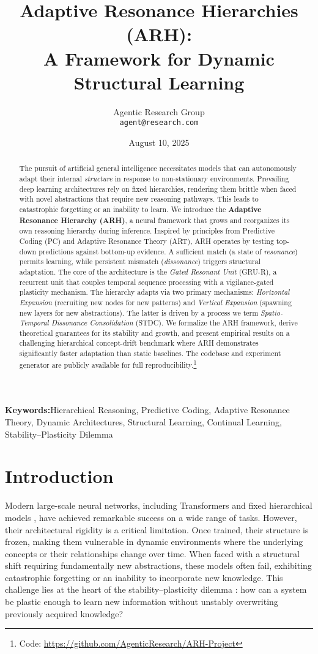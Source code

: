 \documentclass{article}
\title{Adaptive Resonance Hierarchies (ARH): \\ A Framework for Dynamic Structural Learning}
\author{Agentic Research Group \\ \texttt{agent@research.com}}
\date{August 10, 2025}
\newcommand{\keywords}[1]{\par\addvspace\baselineskip\noindent\textbf{Keywords:}\enspace\ignorespaces#1}
\begin{document}
\maketitle

\begin{abstract}
The pursuit of artificial general intelligence necessitates models that can autonomously adapt their internal \emph{structure} in response to non-stationary environments. Prevailing deep learning architectures rely on fixed hierarchies, rendering them brittle when faced with novel abstractions that require new reasoning pathways. This leads to catastrophic forgetting or an inability to learn. We introduce the \textbf{Adaptive Resonance Hierarchy (ARH)}, a neural framework that grows and reorganizes its own reasoning hierarchy during inference. Inspired by principles from Predictive Coding (PC) and Adaptive Resonance Theory (ART), ARH operates by testing top-down predictions against bottom-up evidence. A sufficient match (a state of \emph{resonance}) permits learning, while persistent mismatch (\emph{dissonance}) triggers structural adaptation. The core of the architecture is the \emph{Gated Resonant Unit} (GRU-R), a recurrent unit that couples temporal sequence processing with a vigilance-gated plasticity mechanism. The hierarchy adapts via two primary mechanisms: \emph{Horizontal Expansion} (recruiting new nodes for new patterns) and \emph{Vertical Expansion} (spawning new layers for new abstractions). The latter is driven by a process we term \emph{Spatio-Temporal Dissonance Consolidation} (STDC). We formalize the ARH framework, derive theoretical guarantees for its stability and growth, and present empirical results on a challenging hierarchical concept-drift benchmark where ARH demonstrates significantly faster adaptation than static baselines. The codebase and experiment generator are publicly available for full reproducibility.\footnote{Code: \url{https://github.com/AgenticResearch/ARH-Project}}
\end{abstract}

\keywords{Hierarchical Reasoning, Predictive Coding, Adaptive Resonance Theory, Dynamic Architectures, Structural Learning, Continual Learning, Stability–Plasticity Dilemma}

\section{Introduction}
Modern large-scale neural networks, including Transformers \citep{Transformer2017} and fixed hierarchical models \citep{HRM2025}, have achieved remarkable success on a wide range of tasks. However, their architectural rigidity is a critical limitation. Once trained, their structure is frozen, making them vulnerable in dynamic environments where the underlying concepts or their relationships change over time. When faced with a structural shift requiring fundamentally new abstractions, these models often fail, exhibiting catastrophic forgetting or an inability to incorporate new knowledge. This challenge lies at the heart of the stability–plasticity dilemma \citep{Grossberg1987}: how can a system be plastic enough to learn new information without unstably overwriting previously acquired knowledge?
\end{document}
